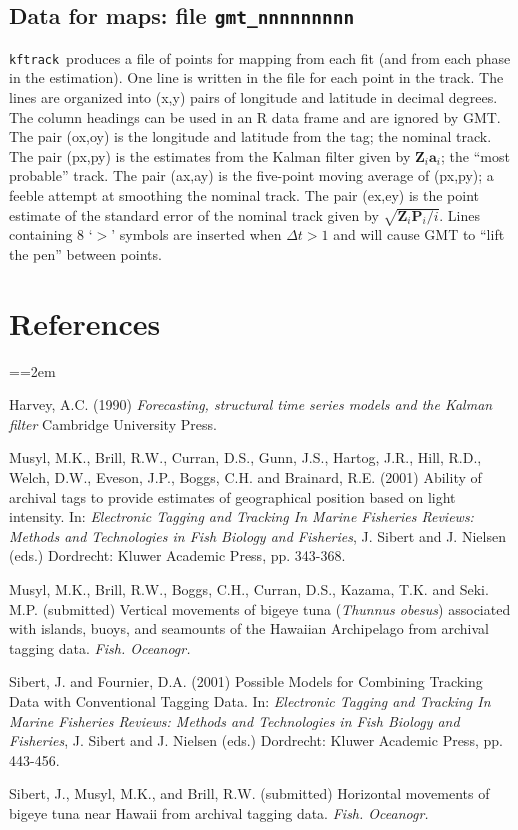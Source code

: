 \documentclass[12pt,draft,titlepage,twoside]{article}
\def\kftrack{\texttt{kftrack}}
\begin{document}
\subsection{Data for maps: file \texttt{gmt\_nnnnnnnnn}}

\kftrack\ produces a file of points for mapping from each fit 
(and from each phase in the estimation). One line is written in the file
for each point in the track. The lines are organized into (x,y) pairs of 
longitude and latitude in decimal degrees. The column headings can be used
in an R data frame and are ignored by GMT.
The pair (ox,oy) is the longitude and latitude from the tag; the nominal track.
The pair (px,py) is the estimates from the Kalman filter given by
$\mathbf{Z}_i\mathbf{a}_i$; the ``most probable'' track.
The pair (ax,ay) is the five-point moving average of (px,py); 
a feeble attempt at smoothing the nominal track.
The pair (ex,ey) is the point estimate of the standard error of the
nominal track given by $\sqrt{\mathbf{Z}_i\mathbf{P}_i/i}$.
Lines containing 8 `$>$' symbols are inserted when $\Delta t > 1$ and will
cause GMT to ``lift the pen'' between points.


\clearpage\section{References}
{\parindent=0cm 
 \everypar={\hangindent=2em }

Harvey, A.C. (1990) {\it Forecasting, structural time series models and the 
Kal\-man filter} Cambridge University Press.

Musyl, M.K., Brill, R.W., Curran, D.S., Gunn, J.S., Hartog, J.R., Hill, R.D., Welch, D.W.,
Eveson, J.P., Boggs, C.H. and Brainard, R.E. (2001) Ability of archival tags 
to provide estimates of geographical position based on light intensity.
In: {\it Electronic Tagging and Tracking In Marine Fisheries Reviews: Methods and Technologies in Fish Biology and Fisheries}, J. Sibert and J. Nielsen (eds.) Dordrecht: Kluwer Academic Press, pp. 343-368.

Musyl, M.K., Brill, R.W., Boggs, C.H., Curran, D.S., Kazama, T.K. and Seki. M.P. (submitted)
Vertical movements of bigeye tuna ({\it Thunnus obesus}) associated with islands, buoys, and
seamounts of the Hawaiian Archipelago from archival tagging data. {\it Fish. Oceanogr.}

Sibert, J. and Fournier, D.A. (2001) Possible Models for Combining Tracking Data with Conventional Tagging Data. 
In: {\it Electronic Tagging and Tracking In Marine Fisheries Reviews: Methods and Technologies in Fish Biology and Fisheries}, J. Sibert and J. Nielsen (eds.) Dordrecht: Kluwer Academic Press, pp. 443-456.

Sibert, J., Musyl, M.K., and Brill, R.W. (submitted) Horizontal movements of bigeye tuna near Hawaii from archival tagging data.  {\it Fish. Oceanogr.}

}
\end{document}
